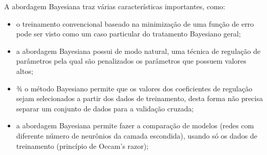 A abordagem Bayesiana traz várias características importantes, como:
\begin{itemize}
    \item o treinamento convencional baseado na minimização de uma função de erro pode ser
visto como um caso particular do tratamento Bayesiano geral;
    
    \item a abordagem Bayesiana possui de modo natural, uma técnica de regulação de
parâmetros pela qual são penalizados os parâmetros que possuem valores altos;
    
    \item ¾ o método Bayesiano permite que os valores dos coeficientes de regulação sejam
selecionados a partir dos dados de treinamento, desta forma não precisa separar um
conjunto de dados para a validação cruzada;
    
    \item a abordagem Bayesiana permite fazer a comparação de modelos (redes com diferente
número de neurônios da camada escondida), usando só os dados de treinamento
(princípio de Occam’s razor); \cite{Tito1999}
\end{itemize}


